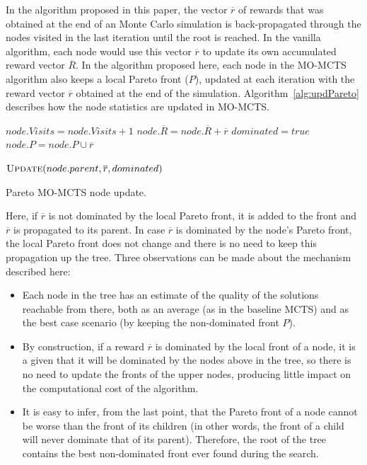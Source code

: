 \documentclass[journal]{IEEEtran}
\begin{document}
In the algorithm proposed in this paper, the vector $\overline{r}$ of rewards that was obtained at the end of an Monte Carlo simulation is back-propagated through the nodes visited in the last iteration until the root is reached. In the vanilla algorithm, each node would use this vector $\overline{r}$ to update its own accumulated reward vector $\overline{R}$. In the algorithm proposed here, each node in the MO-MCTS algorithm also keeps a local Pareto front ($P$), updated at each iteration with the reward vector $\overline{r}$ obtained at the end of the simulation. Algorithm~\ref{alg:updPareto} describes how the node statistics are updated in MO-MCTS.

\begin{algorithm}[!t]
\begin{algorithmic}[1]

	\State $node.Visits = node.Visits + 1$
	\State $node.\overline{R} = node.\overline{R} + \overline{r}$
			\State $dominated = true$
		\Else
			\State $node.P = node.P \cup \overline{r}$
		\EndIf
	\EndIf

	\State $\Call{Update}{node.parent,\overline{r},dominated}$
	
\EndFunction
\end{algorithmic}
\caption{Pareto MO-MCTS node update.}
\label{alg:updPareto}
\end{algorithm}

Here, if $\overline{r}$ is not dominated by the local Pareto front, it is added to the front and $\overline{r}$ is propagated to its parent. In case $\overline{r}$ is dominated by the node's Pareto front, the local Pareto front does not change and there is no need to keep this propagation up the tree. Three observations can be made about the mechanism described here:

\begin{itemize}
\item Each node in the tree has an estimate of the quality of the solutions reachable from there, both as an average (as in the baseline MCTS) and as the best case scenario (by keeping the non-dominated front $P$).
\item By construction, if a reward $\overline{r}$ is dominated by the local front of a node, it is a given that it will be dominated by the nodes above in the tree, so there is no need to update the fronts of the upper nodes, producing little impact on the computational cost of the algorithm.
\item It is easy to infer, from the last point, that the Pareto front of a node cannot be worse than the front of its children (in other words, the front of a child will never dominate that of its parent). Therefore, the root of the tree contains the best non-dominated front ever found during the search.
\end{itemize}
\end{document}
